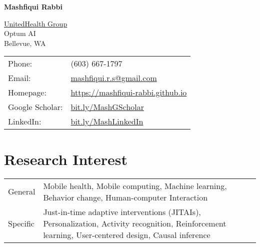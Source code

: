 \documentclass[10pt,fullpage]{article}
\def\name{Mashfiqui Rabbi}
\begin{document}


\centerline{\Large \bf \name}
\vspace{0.25in}
\begin{minipage}{0.50\linewidth}
  \href{http://www.apple.com/}{UnitedHealth Group} \\
  Optum AI\\
  Bellevue, WA 
\end{minipage}
\begin{minipage}{0.50\linewidth}
  \begin{tabular}{ll}
    Phone: & (603) 667-1797 \\
    Email: & \href{mailto:mashfiqui.r.s@gmail.com}{mashfiqui.r.s@gmail.com} \\
    Homepage: & \href{https://mashfiqui-rabbi.github.io/}{https://mashfiqui-rabbi.github.io}\\
    Google Scholar: & \href{http://bit.ly/MashGScholar}{bit.ly/MashGScholar}\\
    LinkedIn: & \href{http://bit.ly/MashLinkedIn}{bit.ly/MashLinkedIn}
  \end{tabular}
\end{minipage}



\section*{\textbf{Research Interest}}
\vspace{-0.5em}
\begin{longtable}{p{0.7in}|p{5.5in}}
		General & Mobile health, Mobile computing, Machine learning, Behavior change, Human-computer Interaction \vspace{0.15cm}\\
	Specific & Just-in-time adaptive interventions (JITAIs), Personalization, Activity recognition, Reinforcement learning, User-centered design, Causal inference \\
\end{longtable}
\end{document}
